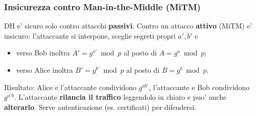 \subsubsection{Insicurezza contro Man-in-the-Middle (MiTM)}
DH e' sicuro solo contro attacchi \textbf{passivi}. Contro un attacco \textbf{attivo} (MiTM) e' insicuro: l'attaccante si interpone, sceglie segreti propri $ a', b' $ e
\begin{itemize}
  \item verso Bob inoltra $ A' = g^{a'} \bmod p $ al posto di $ A = g^a \bmod p $;
  \item verso Alice inoltra $ B' = g^{b'} \bmod p $ al posto di $ B = g^b \bmod p $.
\end{itemize}
Risultato: Alice e l'attaccante condividono $ g^{ab'} $, l'attaccante e Bob condividono $ g^{a'b} $. L'attaccante \textbf{rilancia il traffico} leggendolo in chiaro e puo' anche \textbf{alterarlo}. Serve autenticazione (es. certificati) per difendersi.

% 
